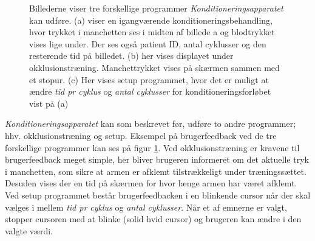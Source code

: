 \begin{figure}[H]
\centering
{}
\caption{Billederne viser tre forskellige programmer \textit{Konditioneringsapparatet} kan udføre. (a) viser en igangværende konditioneringsbehandling, hvor trykket i manchetten ses i midten af billede a og blodtrykket vises lige under. Der ses også patient ID, antal cyklusser og den resterende tid på billedet. (b) her vises displayet under okklusionstræning. Manchettrykket vises på skærmen sammen med et stopur. (c) Her vises setup programmet, hvor det er muligt at ændre \textit{tid pr cyklus} og \textit{antal cyklusser} for konditioneringsforløbet vist på (a)}\label{fig:interface}
\end{figure}

\textit{Konditioneringsapparatet} kan som beskrevet før, udføre to andre programmer; hhv. okklusionstræning og setup. Eksempel på brugerfeedback ved de tre forskellige programmer kan ses på figur \ref{fig:interface}. Ved okklusionstræning er kravene til brugerfeedback meget simple, her bliver brugeren informeret om det aktuelle tryk i manchetten, som sikre at armen er afklemt tilstrækkeligt under træningssættet. Desuden vises der en tid på skærmen for hvor længe armen har været afklemt. Ved setup programmet består brugerfeedbacken i en blinkende cursor når der skal vælges i mellem \textit{tid pr cyklus} og \textit{antal cyklusser}. Når et af emnerne er valgt, stopper cursoren med at blinke (solid hvid cursor) og brugeren kan ændre i den valgte værdi.

